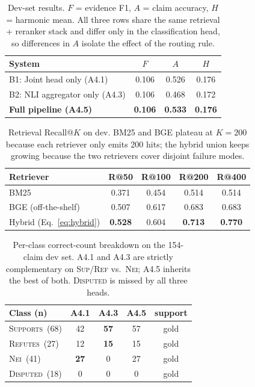 \documentclass[11pt]{article}
\begin{document}
\begin{table}[t]
  \centering
  \small
  \begin{tabular}{lccc}
    \toprule
    \textbf{System} & $F$ & $A$ & $H$ \\
    \midrule
    B1: Joint head only (A4.1)          & 0.106 & 0.526 & 0.176 \\
    B2: NLI aggregator only (A4.3)      & 0.106 & 0.468 & 0.172 \\
    \textbf{Full pipeline (A4.5)}       & \textbf{0.106} & \textbf{0.533} & \textbf{0.176} \\
    \bottomrule
  \end{tabular}
  \caption{Dev-set results. $F$ = evidence F1, $A$ = claim accuracy,
    $H$ = harmonic mean. All three rows share the same retrieval +
    reranker stack and differ only in the classification head, so
    differences in $A$ isolate the effect of the routing rule.}
  \label{tab:main-results}
\end{table}

\begin{table}[t]
  \centering
  \small
  \begin{tabular}{lcccc}
    \toprule
    \textbf{Retriever} & R@50 & R@100 & R@200 & R@400 \\
    \midrule
    BM25                & 0.371 & 0.454 & 0.514 & 0.514 \\
    BGE (off-the-shelf) & 0.507 & 0.617 & 0.683 & 0.683 \\
    Hybrid (Eq.~\ref{eq:hybrid}) & \textbf{0.528} & 0.604 & \textbf{0.713} & \textbf{0.770} \\
    \bottomrule
  \end{tabular}
  \caption{Retrieval Recall@$K$ on dev. BM25 and BGE plateau at $K{=}200$
    because each retriever only emits 200 hits; the hybrid union keeps
    growing because the two retrievers cover disjoint failure modes.}
  \label{tab:recall}
\end{table}

\begin{table}[t]
  \centering
  \small
  \begin{tabular}{lcccc}
    \toprule
    \textbf{Class (n)} & A4.1 & A4.3 & A4.5 & support \\
    \midrule
    \textsc{Supports}~(68)  & 42 & \textbf{57} & 57 & gold \\
    \textsc{Refutes}~(27)   & 12 & \textbf{15} & 15 & gold \\
    \textsc{Nei}~(41)       & \textbf{27} & 0 & 27 & gold \\
    \textsc{Disputed}~(18)  &  0 & 0 &  0 & gold \\
    \bottomrule
  \end{tabular}
  \caption{Per-class correct-count breakdown on the 154-claim dev
    set. A4.1 and A4.3 are strictly complementary on
    \textsc{Sup}/\textsc{Ref} vs.\ \textsc{Nei}; A4.5 inherits the
    best of both. \textsc{Disputed} is missed by all three heads.}
  \label{tab:perclass}
\end{table}
\end{document}
